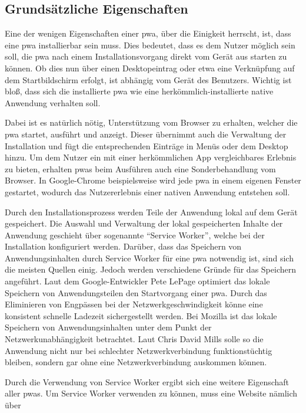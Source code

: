 \documentclass[11pt, parskip=half]{scrartcl}       %
\begin{document}
\subsection{Grundsätzliche Eigenschaften}

Eine der wenigen Eigenschaften einer \ac{pwa}, über die Einigkeit herrscht, ist, dass eine \ac{pwa} installierbar sein muss.
Dies bedeutet, dass es dem Nutzer möglich sein soll, die \ac{pwa} nach einem Installationsvorgang direkt vom Gerät aus starten zu können.
Ob dies nun über einen Desktopeintrag oder etwa eine Verknüpfung auf dem Startbildschirm erfolgt, ist abhängig vom Gerät des Benutzers.
Wichtig ist bloß, dass sich die installierte \ac{pwa} wie eine herkömmlich-installierte native Anwendung verhalten soll.

Dabei ist es natürlich nötig, Unterstützung vom Browser zu erhalten, welcher die \ac{pwa} startet, ausführt und anzeigt.
Dieser übernimmt auch die Verwaltung der Installation und fügt die entsprechenden Einträge in Menüs oder dem Desktop hinzu.
Um dem Nutzer ein mit einer herkömmlichen App vergleichbares Erlebnis zu bieten, erhalten \acp{pwa} beim Ausführen auch eine Sonderbehandlung vom Browser.
In Google-Chrome beispielsweise wird jede \ac{pwa} in einem eigenen Fenster gestartet, wodurch das Nutzererlebnis einer nativen Anwendung entstehen soll\cite{googledevs_pwa}.


Durch den Installationsprozess werden Teile der Anwendung lokal auf dem Gerät gespeichert.
Die Auswahl und Verwaltung der lokal gespeicherten Inhalte der Anwendung geschieht über sogenannte \enquote{Service Worker}, welche bei der Installation konfiguriert werden.
Darüber, dass das Speichern von Anwendungsinhalten durch Service Worker für eine \ac{pwa} notwendig ist, sind sich die meisten Quellen einig.
Jedoch werden verschiedene Gründe für das Speichern angeführt.
Laut dem Google-Entwickler Pete LePage optimiert das lokale Speichern von Anwendungsteilen den Startvorgang einer \ac{pwa}.
Durch das Eliminieren von Engpässen bei der Netzwerkgeschwindigkeit könne eine konsistent schnelle Ladezeit sichergestellt werden.\cite{googledev_pwaondesktop}
Bei Mozilla ist das lokale Speichern von Anwendungsinhalten unter dem Punkt der Netzwerkunabhängigkeit betrachtet.
Laut Chris David Mills solle so die Anwendung nicht nur bei schlechter Netzwerkverbindung funktionstüchtig bleiben, sondern gar ohne eine Netzwerkverbindung auskommen können\cite{mozilladevs-pwaintroduction}.

Durch die Verwendung von Service Worker ergibt sich eine weitere Eigenschaft aller \acp{pwa}.
Um Service Worker verwenden zu können, muss eine Website nämlich über %
\end{document}
